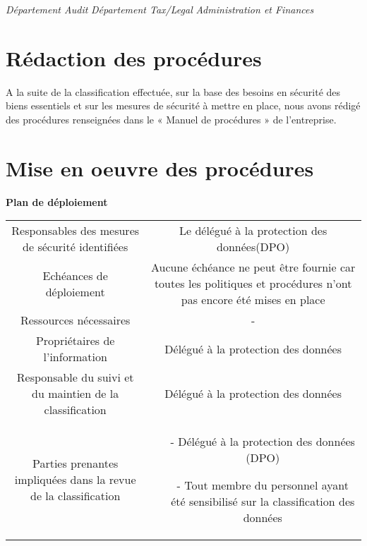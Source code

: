 \textit{Département Audit}
\textit{Département Tax/Legal}
\textit{Administration et Finances}
\section{Rédaction des procédures}
A la suite de la classification effectuée, sur la base des besoins en sécurité des biens essentiels et sur les mesures de sécurité à mettre en place, nous avons rédigé des procédures renseignées dans le « Manuel de procédures » de l’entreprise.

\section{Mise en oeuvre des procédures}
\textbf{Plan de déploiement}
\begin{tabular}{c|c}
    Responsables des mesures de sécurité identifiées & Le délégué à la protection des données(DPO)  \\
     Echéances de déploiement & Aucune échéance ne peut être fournie car toutes les politiques et procédures n’ont pas encore été mises en place \\
     Ressources nécessaires & - \\
     Propriétaires de l'information & Délégué à la protection des données \\
     Responsable du suivi et du maintien de la classification & Délégué à la protection des données \\
     Parties prenantes impliquées dans la revue de la classification & \begin{itemize}
         \item[-] Délégué à la protection des données (DPO)
         \item[-] Tout membre du personnel ayant été sensibilisé sur la classification des données
     \end{itemize}\\
\end{tabular}